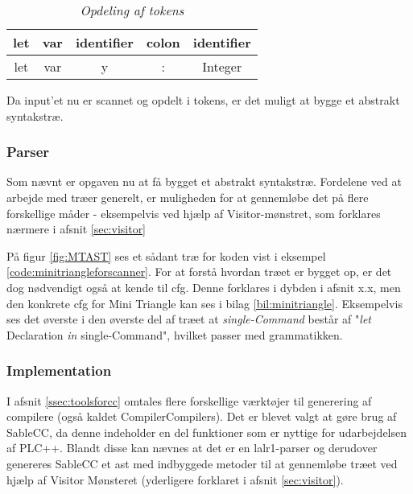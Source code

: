 \begin{table}[H]
\centering
    \begin{tabular}{|c|c|c|c|c|}
    \hline
    \textbf{let} & \textbf{var} & \textbf{identifier} & \textbf{colon} & \textbf{identifier} \\ \hline
    let          & var          & y                   & :              & Integer             \\ \hline
    \end{tabular}
\caption{\textit{Opdeling af tokens}}
\label{tab:tokensMT}
\end{table}

\noindent Da input'et nu er scannet og opdelt i tokens, er det muligt at bygge et abstrakt syntakstræ.

\subsubsection{Parser}
Som nævnt er opgaven nu at få bygget et abstrakt syntakstræ. Fordelene ved at arbejde med træer generelt, er muligheden for at gennemløbe det på flere forskellige måder - eksempelvis ved hjælp af Visitor-mønstret, som forklares nærmere i afsnit \ref{sec:visitor}


\noindent På figur \ref{fig:MTAST} ses et sådant træ for koden vist i eksempel \ref{code:minitriangleforscanner}. For at forstå hvordan træet er bygget op, er det dog nødvendigt også at kende til \gls{cfg}. Denne forklares i dybden i afsnit x.x, men den konkrete \gls{cfg} for Mini Triangle kan ses i bilag \ref{bil:minitriangle}. Eksempelvis ses det øverste i den øverste del af træet at \textit{single-Command} består af "\textit{let} Declaration \textit{in} single-Command"\mbox{}, hvilket passer med grammatikken.


\subsubsection{Implementation}
\wip{}

I afsnit \ref{ssec:toolsforcc} omtales flere forskellige værktøjer til generering af compilere (også kaldet CompilerCompilers). Det er blevet valgt at gøre brug af SableCC, da denne indeholder en del funktioner som er nyttige for udarbejdelsen af PLC++. Blandt disse kan nævnes at det er en \gls{lalr}1-parser og derudover genereres SableCC et \gls{ast} med indbyggede metoder til at gennemløbe træet ved hjælp af Visitor Mønsteret (yderligere forklaret i afsnit \ref{sec:visitor}). 


